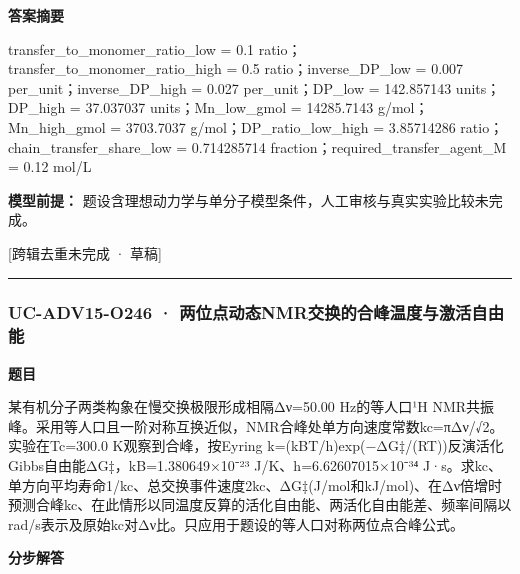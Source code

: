 \documentclass[UTF8,11pt,a4paper]{ctexart}
\begin{document}
\noindent\textbf{答案摘要}\par
transfer\_to\_monomer\_ratio\_low = 0.1 ratio；transfer\_to\_monomer\_ratio\_high = 0.5 ratio；inverse\_DP\_low = 0.007 per\_unit；inverse\_DP\_high = 0.027 per\_unit；DP\_low = 142.857143 units；DP\_high = 37.037037 units；Mn\_low\_gmol = 14285.7143 g/mol；Mn\_high\_gmol = 3703.7037 g/mol；DP\_ratio\_low\_high = 3.85714286 ratio；chain\_transfer\_share\_low = 0.714285714 fraction；required\_transfer\_agent\_M = 0.12 mol/L\par
\noindent\textbf{模型前提：}
题设含理想动力学与单分子模型条件，人工审核与真实实验比较未完成。\par
\noindent\textcolor{red!65!black}{[跨辑去重未完成 · 草稿]} \par
\medskip\hrule\medskip
{}
\subsubsection*{UC-ADV15-O246 · 两位点动态NMR交换的合峰温度与激活自由能}
\noindent\textbf{题目}\par
某有机分子两类构象在慢交换极限形成相隔Δν=50.00 Hz的等人口¹H NMR共振峰。采用等人口且一阶对称互换近似，NMR合峰处单方向速度常数kc=πΔν/√2。实验在Tc=300.0 K观察到合峰，按Eyring k=(kBT/h)exp(−ΔG‡/(RT))反演活化Gibbs自由能ΔG‡，kB=1.380649×10⁻²³ J/K、h=6.62607015×10⁻³⁴ J·s。求kc、单方向平均寿命1/kc、总交换事件速度2kc、ΔG‡(J/mol和kJ/mol)、在Δν倍增时预测合峰kc、在此情形以同温度反算的活化自由能、两活化自由能差、频率间隔以rad/s表示及原始kc对Δν比。只应用于题设的等人口对称两位点合峰公式。\par
\medskip\noindent\textbf{分步解答}
\end{document}
